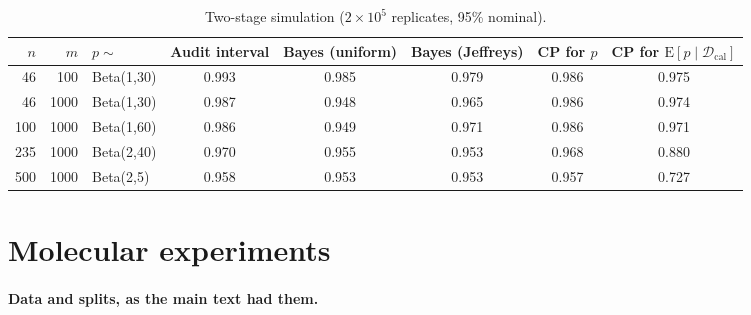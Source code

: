 \documentclass[10pt]{article}
\newcommand{\Dcal}{\mathcal D_{\mathrm{cal}}}
\begin{document}
\begin{table}[ht]
\centering
\caption{Two-stage simulation ($2\times10^5$ replicates, 95\% nominal).}
\label{tab:twostage}
\small
\begin{tabular}{rrlccccc}
\toprule
$n$ & $m$ & $p\sim$ & Audit interval & Bayes (uniform) & Bayes (Jeffreys) & CP for $p$ & CP for $\mathrm{E}[p\mid\Dcal]$ \\
\midrule
 46 &  100 & Beta(1,30) & 0.993 & 0.985 & 0.979 & 0.986 & 0.975 \\
 46 & 1000 & Beta(1,30) & 0.987 & 0.948 & 0.965 & 0.986 & 0.974 \\
100 & 1000 & Beta(1,60) & 0.986 & 0.949 & 0.971 & 0.986 & 0.971 \\
235 & 1000 & Beta(2,40) & 0.970 & 0.955 & 0.953 & 0.968 & 0.880 \\
500 & 1000 & Beta(2,5)  & 0.958 & 0.953 & 0.953 & 0.957 & 0.727 \\
\bottomrule
\end{tabular}
\end{table}

\section{Molecular experiments}
\label{sec:molecular}

\paragraph{Data and splits, as the main text had them.}
\end{document}

